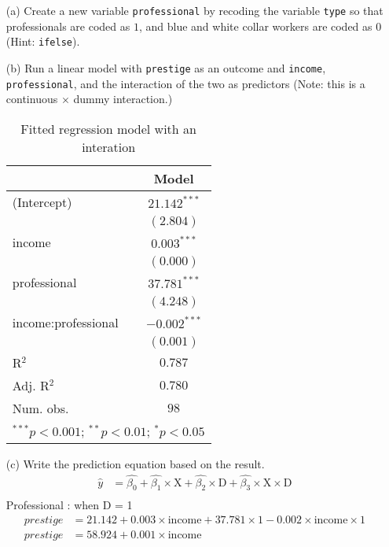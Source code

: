 \documentclass[12pt,letterpaper]{article}
\begin{document}
\newpage
\begin{enumerate}
	
	\item [(a)]
	Create a new variable \texttt{professional} by recoding the variable \texttt{type} so that professionals are coded as $1$, and blue and white collar workers are coded as $0$ (Hint: \texttt{ifelse}).
		  
	
	\vspace{1cm}
	
	
	\item [(b)]
	Run a linear model with \texttt{prestige} as an outcome and \texttt{income}, \texttt{professional}, and the interaction of the two as predictors (Note: this is a continuous $\times$ dummy interaction.)
	  
	\begin{table}
		\begin{center}
			\begin{tabular}{l c}
				\hline 
				& Model  \\
				\hline(Intercept)          & $21.142^{***}$ \\                     & $(2.804)$      \\income               & $0.003^{***}$  \\                     & $(0.000)$      \\professional        & $37.781^{***}$ \\                     & $(4.248)$      \\income:professional & $-0.002^{***}$ \\                     & $(0.001)$      \\
				\hline
				R$^2$                & $0.787$        \\Adj. R$^2$           & $0.780$        
				\\Num. obs.            & $98$           \\
				\hline
				\multicolumn{2}{l}{\scriptsize{$^{***}p<0.001$; $^{**}p<0.01$; $^{*}p<0.05$}}
			\end{tabular}\caption{Fitted regression model with an interation}\label{table:coefficients}
		\end{center}
	\end{table}
	\vspace{7cm}
	
	\item [(c)]
	Write the prediction equation based on the result.
	\begin{align*}
		\hat{y} &= \hat{\beta_0} + \hat{\beta_1} \times  \text{X}+\hat{\beta_2}\times \text{D}+\hat{\beta_3}\times \text{X}\times \text{D}\\
	\end{align*}
		\noindent Professional : when D = 1
	\begin{align*}
		prestige &= 21.142 + 0.003 \times \text{income} + 37.781\times 1 - 0.002\times \text{income}\times 1 \\
		prestige &= 58.924 + 0.001 \times \text{income}
	\end{align*}
		

\end{enumerate}
\end{document}
